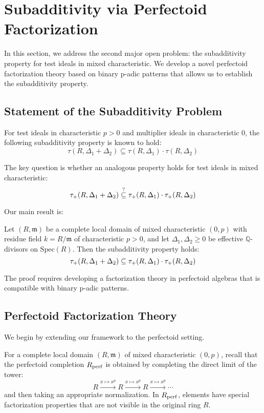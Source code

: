 \section{Subadditivity via Perfectoid Factorization}\label{sec:subadditivity}

In this section, we address the second major open problem: the subadditivity property for test ideals in mixed characteristic. We develop a novel perfectoid factorization theory based on binary p-adic patterns that allows us to establish the subadditivity property.

\subsection{Statement of the Subadditivity Problem}

For test ideals in characteristic $p > 0$ and multiplier ideals in characteristic 0, the following subadditivity property is known to hold:
$$\tau(R,\Delta_1+\Delta_2) \subseteq \tau(R,\Delta_1) \cdot \tau(R,\Delta_2)$$

The key question is whether an analogous property holds for test ideals in mixed characteristic:
$$\tau_+(R,\Delta_1+\Delta_2) \stackrel{?}{\subseteq} \tau_+(R,\Delta_1) \cdot \tau_+(R,\Delta_2)$$

Our main result is:

\begin{theorem}\label{thm:subadditivity}
Let $(R,\mathfrak{m})$ be a complete local domain of mixed characteristic $(0,p)$ with residue field $k = R/\mathfrak{m}$ of characteristic $p > 0$, and let $\Delta_1, \Delta_2 \geq 0$ be effective $\mathbb{Q}$-divisors on $\text{Spec}(R)$. Then the subadditivity property holds:
$$\tau_+(R,\Delta_1+\Delta_2) \subseteq \tau_+(R,\Delta_1) \cdot \tau_+(R,\Delta_2)$$
\end{theorem}

The proof requires developing a factorization theory in perfectoid algebras that is compatible with binary p-adic patterns.

\subsection{Perfectoid Factorization Theory}

We begin by extending our framework to the perfectoid setting.

\begin{definition}\label{def:perfectoid-completion-extended}
For a complete local domain $(R,\mathfrak{m})$ of mixed characteristic $(0,p)$, recall that the perfectoid completion $R_{\operatorname{perf}}$ is obtained by completing the direct limit of the tower:
$$R \xrightarrow{x \mapsto x^p} R \xrightarrow{x \mapsto x^p} R \xrightarrow{x \mapsto x^p} \cdots$$
and then taking an appropriate normalization. In $R_{\operatorname{perf}}$, elements have special factorization properties that are not visible in the original ring $R$.
\end{definition}

